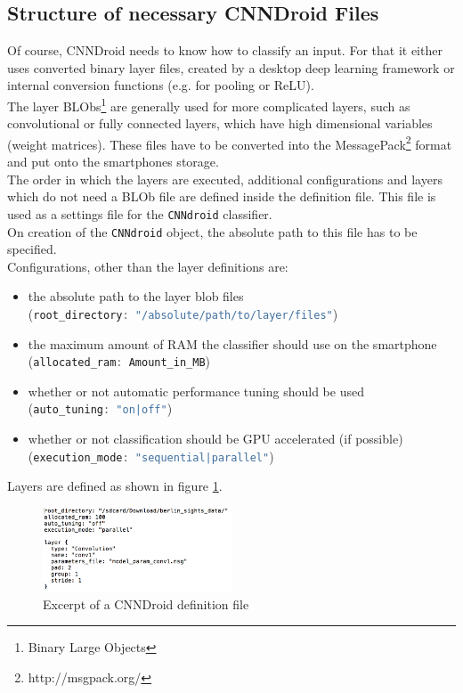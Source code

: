 \subsection{Structure of necessary CNNDroid Files}
Of course, CNNDroid needs to know how to classify an input. For that it either uses converted binary layer files, created by a desktop deep learning framework or internal conversion functions (e.g. for pooling or ReLU).\\
The layer BLObs\footnote{Binary Large Objects} are generally used for more complicated layers, such as convolutional or fully connected layers, which have high dimensional variables (weight matrices). These files have to be converted into the MessagePack\footnote{http://msgpack.org/} format and put onto the smartphones storage.\\
The order in which the layers are executed, additional configurations and layers which do not need a BLOb file are defined inside the definition file. This file is used as a settings file for the \lstinline[language=Java]{CNNdroid} classifier.\\
On creation of the \lstinline[language=Java]{CNNdroid} object, the absolute path to this file has to be specified.\\
Configurations, other than the layer definitions are:
\begin{itemize}
    \item{the absolute path to the layer blob files\\(\lstinline[language=Java]{root_directory: "/absolute/path/to/layer/files"})}
    \item{the maximum amount of RAM the classifier should use on the smartphone\\(\lstinline[language=Java]{allocated_ram: Amount_in_MB})}
    \item{whether or not automatic performance tuning should be used\\(\lstinline[language=Java]{auto_tuning: "on|off"})}
    \item{whether or not classification should be GPU accelerated (if possible)\\(\lstinline[language=Java]{execution_mode: "sequential|parallel"})}
\end{itemize}
Layers are defined as shown in figure \ref{fig:def_file}.

\begin{figure}[H]
  \centering
    \includegraphics[width=0.5\textwidth]{def_file.png}
  \caption{Excerpt of a CNNDroid definition file}
  \label{fig:def_file}
\end{figure}

